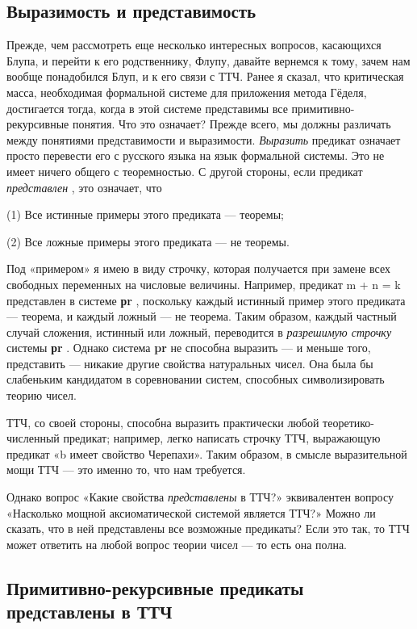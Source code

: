 \documentclass[../main.tex]{subfiles}
\begin{document}
\subsection{Выразимость и представимость}

Прежде, чем рассмотреть еще несколько интересных вопросов, касающихся Блупа, и перейти к его родственнику, Флупу, давайте вернемся к тому, зачем нам вообще понадобился Блуп, и к его связи с ТТЧ. Ранее я сказал, что критическая масса, необходимая формальной системе для приложения метода Гёделя, достигается тогда, когда в этой системе представимы все примитивно-рекурсивные понятия. Что это означает? Прежде всего, мы должны различать между понятиями представимости и выразимости. \emph{Выразить} предикат означает просто перевести его с русского языка на язык формальной системы. Это не имеет ничего общего с теоремностью. С другой стороны, если предикат \emph{представлен} , это означает, что

(1) Все истинные примеры этого предиката --- теоремы;

(2) Все ложные примеры этого предиката --- не теоремы.

Под «примером» я имею в виду строчку, которая получается при замене всех свободных переменных на числовые величины. Например, предикат m + n = k представлен в системе \textbf{рr} , поскольку каждый истинный пример этого предиката --- теорема, и каждый ложный --- не теорема. Таким образом, каждый частный случай сложения, истинный или ложный, переводится в \emph{разрешимую строчку} системы \textbf{рr} . Однако система \textbf{pr} не способна выразить --- и меньше того, представить --- никакие другие свойства натуральных чисел. Она была бы слабеньким кандидатом в соревновании систем, способных символизировать теорию чисел.

ТТЧ, со своей стороны, способна выразить практически любой теоретико-численный предикат; например, легко написать строчку ТТЧ, выражающую предикат «b имеет свойство Черепахи». Таким образом, в смысле выразительной мощи ТТЧ --- это именно то, что нам требуется.

Однако вопрос «Какие свойства \emph{представлены} в ТТЧ?» эквивалентен вопросу «Насколько мощной аксиоматической системой является ТТЧ?» Можно ли сказать, что в ней представлены все возможные предикаты? Если это так, то ТТЧ может ответить на любой вопрос теории чисел --- то есть она полна.


\subsection{Примитивно-рекурсивные предикаты представлены в ТТЧ}
\end{document}
